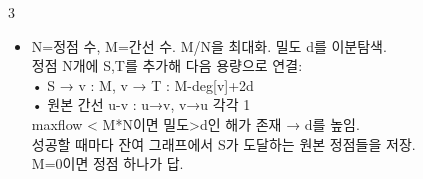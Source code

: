 \documentclass[landscape, 8pt, a4paper, oneside]{extarticle}
\begin{document}
\begin{multicols*}{3}
\begin{itemize}
    \begin{itemize}
      \item N=정점 수, M=간선 수. M/N을 최대화. 밀도 d를 이분탐색.\\
      정점 N개에 S,T를 추가해 다음 용량으로 연결:\\
      • S → v : M, v → T : M-deg[v]+2d\\
      • 원본 간선 u-v : u→v, v→u 각각 1\\
      maxflow < M*N이면 밀도>d인 해가 존재 → d를 높임.\\
      성공할 때마다 잔여 그래프에서 S가 도달하는 원본 정점들을 저장.\\
      M=0이면 정점 하나가 답.
    \end{itemize}
  \end{itemize}
\end{multicols*}

\end{document}
